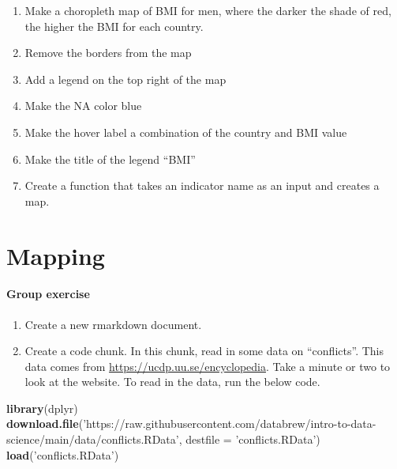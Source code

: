 \documentclass[
]{book}
\newenvironment{Shaded}{\begin{snugshade}}{\end{snugshade}}
\newcommand{\DataTypeTok}[1]{\textcolor[rgb]{0.13,0.29,0.53}{#1}}
\newcommand{\KeywordTok}[1]{\textcolor[rgb]{0.13,0.29,0.53}{\textbf{#1}}}
\newcommand{\NormalTok}[1]{#1}
\newcommand{\StringTok}[1]{\textcolor[rgb]{0.31,0.60,0.02}{#1}}
\begin{document}
\begin{enumerate}
\def\labelenumi{\arabic{enumi}.}
\item
  Make a choropleth map of BMI for men, where the darker the shade of red, the higher the BMI for each country.
\item
  Remove the borders from the map
\item
  Add a legend on the top right of the map
\item
  Make the NA color blue
\item
  Make the hover label a combination of the country and BMI value
\item
  Make the title of the legend ``BMI''
\item
  Create a function that takes an indicator name as an input and creates a map.
\end{enumerate}

\hypertarget{mapping}{%
\chapter{Mapping}\label{mapping}}

\hypertarget{group-exercise}{%
\subsubsection*{Group exercise}\label{group-exercise}}

\begin{enumerate}
\def\labelenumi{\arabic{enumi}.}
\item
  Create a new rmarkdown document.
\item
  Create a code chunk. In this chunk, read in some data on ``conflicts''. This data comes from \url{https://ucdp.uu.se/encyclopedia}. Take a minute or two to look at the website. To read in the data, run the below code.
\end{enumerate}

\begin{Shaded}
\begin{Highlighting}[]
\KeywordTok{library}\NormalTok{(dplyr)}
\KeywordTok{download.file}\NormalTok{(}\StringTok{'https://raw.githubusercontent.com/databrew/intro-to-data-science/main/data/conflicts.RData'}\NormalTok{,}
              \DataTypeTok{destfile =} \StringTok{'conflicts.RData'}\NormalTok{)}
\KeywordTok{load}\NormalTok{(}\StringTok{'conflicts.RData'}\NormalTok{)}
\end{Highlighting}
\end{Shaded}
\end{document}
